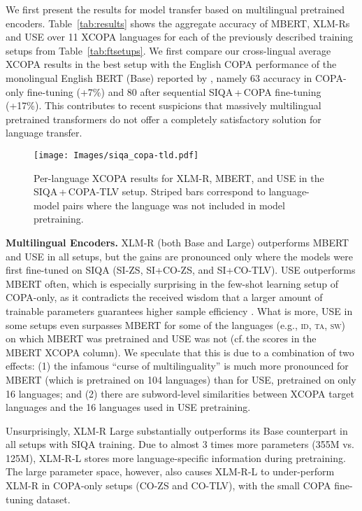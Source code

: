 \documentclass[11pt,a4paper]{article}
\begin{document}
We first present the results for model transfer based on multilingual pretrained encoders. Table~\ref{tab:results} shows the aggregate accuracy of MBERT, XLM-Rs and USE over 11 XCOPA languages for each of the previously described training setups from Table~\ref{tab:ftsetups}. We first compare our cross-lingual average XCOPA results in the best setup with the English COPA performance of the monolingual English BERT (Base) reported by , namely 63 accuracy in COPA-only fine-tuning (+7\%) and 80 after sequential SIQA\,+\,COPA fine-tuning (+17\%). This contributes to recent suspicions \cite{cao2020multilingual,Hu:2020arxiv} that massively multilingual pretrained transformers do not offer a completely satisfactory solution for language transfer.
\begin{figure*}[!t]
    \centering
    \texttt{[image: Images/siqa\_copa-tld.pdf]}
    \vspace{-3.5mm}
    \caption{Per-language XCOPA results for XLM-R, MBERT, and USE in the SIQA\,+\,COPA-TLV setup. Striped bars correspond to language-model pairs where the language was not included in model pretraining.}
    \label{fig:lang_res}
    \vspace{-1.5mm}
\end{figure*}


\vspace{1.4mm}
\noindent \textbf{Multilingual Encoders.} XLM-R (both Base and Large) outperforms MBERT and USE in all setups, but the gains are pronounced only where the models were first fine-tuned on SIQA (SI-ZS, SI+CO-ZS, and SI+CO-TLV). USE outperforms MBERT often, which is especially surprising in the few-shot learning setup of COPA-only, as it contradicts the received wisdom that a larger amount of trainable parameters guarantees higher sample efficiency \citep{kaplan2020scaling}.
What is more, USE in some setups even surpasses MBERT for some of the languages (e.g., \textsc{id}, \textsc{ta}, \textsc{sw}) on which MBERT was pretrained and USE was not (cf.\,the scores in the MBERT\,\,XCOPA column). We speculate that this is due to a combination of two effects: (1) the infamous ``curse of multilinguality'' \cite{conneau2019unsupervised} is much more pronounced for MBERT (which is pretrained on 104 languages) than for USE, pretrained on only 16 languages; and (2) there are subword-level similarities between XCOPA target languages and the 16 languages used in USE pretraining.


Unsurprisingly, XLM-R Large substantially outperforms its Base counterpart in all setups with SIQA training. Due to almost 3 times more parameters (355M vs.\,125M), XLM-R-L stores more language-specific information during pretraining. The large parameter space, however, also causes XLM-R-L to under-perform XLM-R in COPA-only setups (CO-ZS and CO-TLV), with the small COPA fine-tuning dataset.
\end{document}

